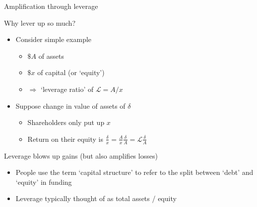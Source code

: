 \begin{frame}{Amplification through leverage}

Why lever up so much?
\vspace{1.5mm}
	\begin{itemize}
	\item	Consider simple example
		\begin{itemize}
		\item	$\$A$ of assets
		\item	$\$x$ of capital (or `equity')
		\item	$\Rightarrow$ `leverage ratio' of $\mathcal{L}=A/x$
		\end{itemize}
	\item	Suppose change in value of assets of $\delta$
		\begin{itemize}
		\item	Shareholders only put up $x$
		\item	Return on their equity is $\frac{\delta}{x}=\frac{A}{x}\frac{\delta}{A}=\mathcal{L}\frac{\delta}{A}$
		\end{itemize}
	\end{itemize}
\vspace{2mm}
Leverage blows up gains (but also amplifies losses)
	\begin{itemize}
	\item	People use the term `capital structure' to refer to the split between `debt' and `equity' in funding
	\item	Leverage typically thought of as total assets / equity
	\end{itemize}
	
\end{frame}



